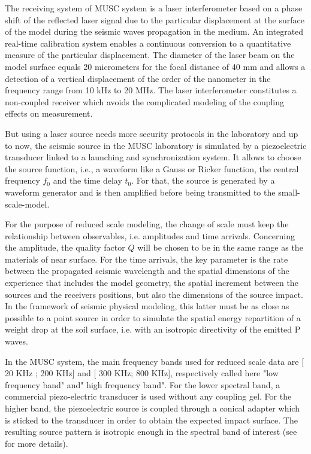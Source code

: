 \documentclass[manuscript,revised]{geophysics}
\begin{document}
\noindent The receiving system of MUSC system is a laser interferometer based on a phase shift of the reflected laser signal due to the particular displacement at the surface of the model during the seismic waves propagation in the medium. An integrated real-time calibration system enables a continuous conversion to a quantitative measure of the particular displacement. The diameter of the laser beam on the model surface equals 20 micrometers for the focal distance of 40 mm and allows a detection of a vertical displacement of the order of the nanometer in the frequency range from 10 kHz to 20 MHz. The laser interferometer constitutes a non-coupled receiver which avoids the complicated modeling of the coupling effects on measurement.

\noindent But using a laser source needs more security protocols in the laboratory and up to now, the seismic source in the MUSC laboratory is simulated by a piezoelectric transducer linked to a launching and synchronization system. It allows to choose the source function, i.e., a waveform like a Gauss or Ricker function, the central frequency $f_{0}$ and the time delay $t_{0}$. For that, the source is generated by a waveform generator and is then amplified before being transmitted to the small-scale-model.

\noindent For the purpose of reduced scale modeling, the change of scale must keep the relationship between observables, i.e. amplitudes and time arrivals. Concerning the amplitude, the quality factor $Q$ will be chosen to be in the same range as the materials of near surface. For the time arrivals, the key parameter is the rate between the propagated seismic wavelength and the spatial dimensions of the experience that includes the model geometry, the spatial increment between the sources and the receivers positions, but also the dimensions of the source impact. In the framework of seismic physical modeling, this latter must be as close as possible to a point source in order to simulate the spatial energy repartition of a weight drop at the soil surface, i.e. with an isotropic directivity of the emitted P waves.

\noindent In the MUSC system, the main frequency bands used for reduced scale data are [ 20 KHz ; 200 KHz] and [ 300 KHz; 800 KHz], respectively called here "low frequency band" and" high frequency band". For the lower spectral band, a commercial piezo-electric transducer is used without any coupling gel. For the higher band, the piezoelectric source is coupled through a conical adapter which is sticked to the transducer in order to obtain the expected impact surface. The resulting source pattern is isotropic enough in the spectral band of interest (see \citep{Bretaudeau_SSM_2011} for more details).
\end{document}
